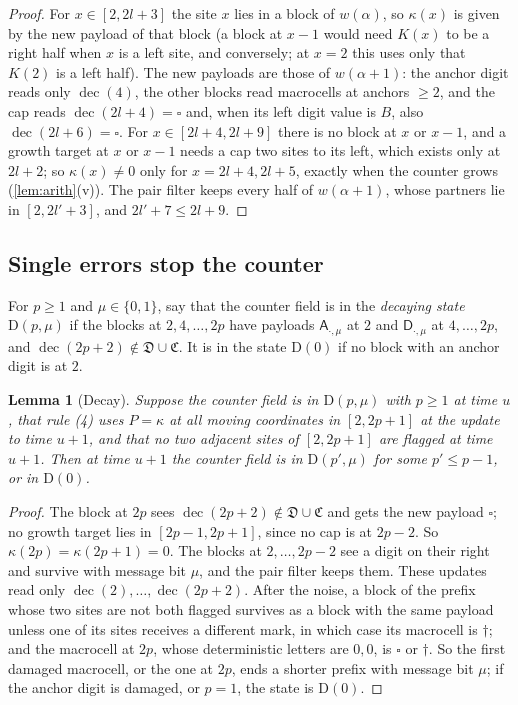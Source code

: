 \documentclass[11pt]{article}
\theoremstyle{plain}
\newtheorem{lemma}[theorem]{Lemma}
\theoremstyle{definition}
\theoremstyle{remark}
\newcommand{\mA}{\mathsf A}
\newcommand{\mD}{\mathsf D}
\newcommand{\blank}{\square}
\newcommand{\inv}{\dagger}
\newcommand{\dec}{\operatorname{dec}}
\begin{document}
\begin{proof}
For $x\in[2,2l+3]$ the site $x$ lies in a block of $w(\alpha)$, so $\kappa(x)$ is given by the new payload of that block (a block at $x-1$ would need $K(x)$ to be a right half when $x$ is a left site, and conversely; at $x=2$ this uses only that $K(2)$ is a left half). The new payloads are those of $w(\alpha+1)$: the anchor digit reads only $\dec(4)$, the other blocks read macrocells at anchors $\ge2$, and the cap reads $\dec(2l+4)=\blank$ and, when its left digit value is $B$, also $\dec(2l+6)=\blank$. For $x\in[2l+4,2l+9]$ there is no block at $x$ or $x-1$, and a growth target at $x$ or $x-1$ needs a cap two sites to its left, which exists only at $2l+2$; so $\kappa(x)\ne0$ only for $x=2l+4,2l+5$, exactly when the counter grows (\cref{lem:arith}(v)). The pair filter keeps every half of $w(\alpha+1)$, whose partners lie in $[2,2l'+3]$, and $2l'+7\le2l+9$.
\end{proof}

\subsection{Single errors stop the counter}

For $p\ge1$ and $\mu\in\{0,1\}$, say that the counter field is in the \emph{decaying state} $\mathrm{D}(p,\mu)$ if the blocks at $2,4,\dots,2p$ have payloads $\mA_{\cdot,\mu}$ at $2$ and $\mD_{\cdot,\mu}$ at $4,\dots,2p$, and $\dec(2p+2)\notin\mathfrak D\cup\mathfrak C$. It is in the state $\mathrm D(0)$ if no block with an anchor digit is at $2$.

\begin{lemma}[Decay]\label{lem:decay}
Suppose the counter field is in $\mathrm D(p,\mu)$ with $p\ge1$ at time $u$, that rule (4) uses $P=\kappa$ at all moving coordinates in $[2,2p+1]$ at the update to time $u+1$, and that no two adjacent sites of $[2,2p+1]$ are flagged at time $u+1$. Then at time $u+1$ the counter field is in $\mathrm D(p',\mu)$ for some $p'\le p-1$, or in $\mathrm D(0)$.
\end{lemma}

\begin{proof}
The block at $2p$ sees $\dec(2p+2)\notin\mathfrak D\cup\mathfrak C$ and gets the new payload $\blank$; no growth target lies in $[2p-1,2p+1]$, since no cap is at $2p-2$. So $\kappa(2p)=\kappa(2p+1)=0$. The blocks at $2,\dots,2p-2$ see a digit on their right and survive with message bit $\mu$, and the pair filter keeps them. These updates read only $\dec(2),\dots,\dec(2p+2)$. After the noise, a block of the prefix whose two sites are not both flagged survives as a block with the same payload unless one of its sites receives a different mark, in which case its macrocell is $\inv$; and the macrocell at $2p$, whose deterministic letters are $0,0$, is $\blank$ or $\inv$. So the first damaged macrocell, or the one at $2p$, ends a shorter prefix with message bit $\mu$; if the anchor digit is damaged, or $p=1$, the state is $\mathrm D(0)$.
\end{proof}
\end{document}
